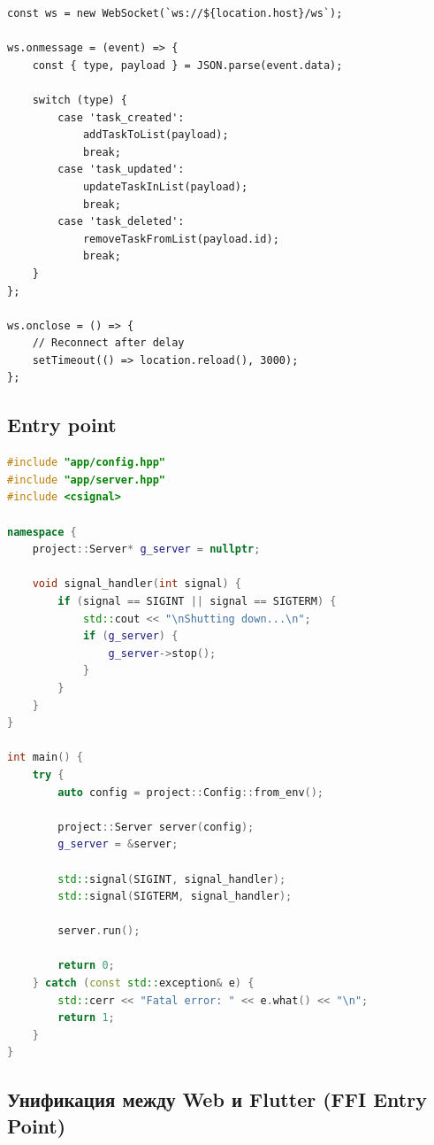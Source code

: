 \begin{lstlisting}[basicstyle=\small\ttfamily, caption={WebSocket client (JavaScript)}]
const ws = new WebSocket(`ws://${location.host}/ws`);

ws.onmessage = (event) => {
    const { type, payload } = JSON.parse(event.data);
    
    switch (type) {
        case 'task_created':
            addTaskToList(payload);
            break;
        case 'task_updated':
            updateTaskInList(payload);
            break;
        case 'task_deleted':
            removeTaskFromList(payload.id);
            break;
    }
};

ws.onclose = () => {
    // Reconnect after delay
    setTimeout(() => location.reload(), 3000);
};
\end{lstlisting}

\subsection{Entry point}

\begin{lstlisting}[language=C++, basicstyle=\small\ttfamily, caption={main.cpp}]
#include "app/config.hpp"
#include "app/server.hpp"
#include <csignal>

namespace {
    project::Server* g_server = nullptr;
    
    void signal_handler(int signal) {
        if (signal == SIGINT || signal == SIGTERM) {
            std::cout << "\nShutting down...\n";
            if (g_server) {
                g_server->stop();
            }
        }
    }
}

int main() {
    try {
        auto config = project::Config::from_env();
        
        project::Server server(config);
        g_server = &server;
        
        std::signal(SIGINT, signal_handler);
        std::signal(SIGTERM, signal_handler);
        
        server.run();
        
        return 0;
    } catch (const std::exception& e) {
        std::cerr << "Fatal error: " << e.what() << "\n";
        return 1;
    }
}
\end{lstlisting}

\subsection{Унификация между Web и Flutter (FFI Entry Point)}

